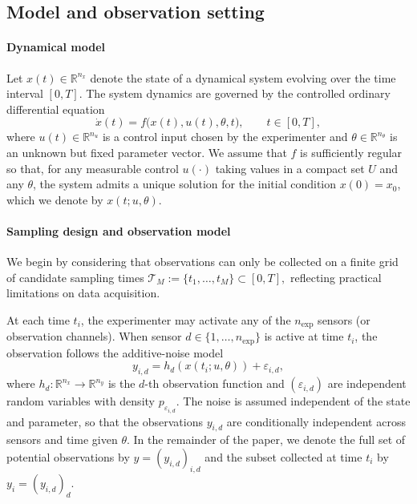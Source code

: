 \documentclass[a4paper,11pt]{article}
\begin{document}
\subsection{Model and observation setting}

\paragraph{Dynamical model}

Let $x(t)\in\mathbb{R}^{n_x}$ denote the state of a dynamical system evolving over the time interval $[0,T]$.
The system dynamics are governed by the controlled ordinary differential equation
\begin{equation}
    \dot x(t) = f\bigl(x(t),u(t),\theta,t\bigr), \qquad t\in[0,T],
\end{equation}
where $u(t)\in\mathbb{R}^{n_u}$ is a control input chosen by the experimenter and
$\theta\in\mathbb{R}^{n_\theta}$ is an unknown but fixed parameter vector. We assume that $f$ is sufficiently regular so that, for any measurable control $u(\cdot)$ taking values in a compact set $U$ and any $\theta$, the system admits a unique solution for the initial condition $x(0)=x_0$, which we denote by $x(t;u,\theta)$.

\paragraph{Sampling design and observation model}

We begin by considering that observations can only be collected on a finite grid of candidate sampling times
\(
    \mathcal{T}_M := \{t_1,\dots,t_M\}\subset[0,T],
\)
reflecting practical limitations on data acquisition.

At each time $t_i$, the experimenter may activate any of the $n_{\mathrm{exp}}$ sensors (or observation channels). When sensor $d\in\{1,\dots,n_{\mathrm{exp}}\}$ is active at time $t_i$, the observation follows the additive-noise model
\begin{equation}\label{eq:obs-model}
  y_{i,d}=h_d\!\left(x(t_i;u,\theta)\right)+\varepsilon_{i,d},
\end{equation}
where $h_d:\mathbb{R}^{n_x}\to\mathbb{R}^{n_y}$ is the $d$-th observation function and $(\varepsilon_{i,d})$ are independent random variables with density $p_{\varepsilon_{i,d}}$. The noise is assumed independent of the state and parameter, so that the observations $y_{i,d}$ are conditionally independent across sensors and time given $\theta$. In the remainder of the paper, we denote the full set of potential observations by $y = (y_{i,d})_{i,d}$ and the subset collected at time $t_i$ by $y_i = (y_{i,d})_{d}$.
\end{document}
